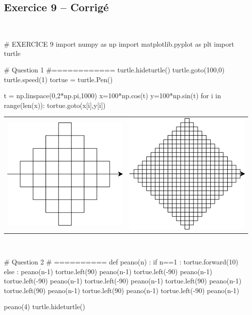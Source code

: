 \documentclass[10pt,fleqn]{article} %
\begin{document}
{}
\subsection*{Exercice 9 -- Corrigé}

\begin{corrige}
$\quad$
\begin{python}
# EXERCICE 9
import numpy as np
import matplotlib.pyplot as plt
import turtle

# Question 1 
#============
turtle.hideturtle()
turtle.goto(100,0)
turtle.speed(1)
tortue = turtle.Pen()

t = np.linspace(0,2*np.pi,1000)
x=100*np.cos(t)
y=100*np.sin(t)
for i in range(len(x)):
    tortue.goto(x[i],y[i])
\end{python}
\end{corrige}


\begin{center}
\begin{tabular}{cc}
\includegraphics[width=.3\linewidth]{images/exo_FB_09_01}&
\includegraphics[width=.3\linewidth]{images/exo_FB_09_02}
\end{tabular}
\end{center}



\begin{corrige}
$\quad$
\begin{python}
# Question 2 
# ==========
def peano(n) : 
    if n==1 :
        tortue.forward(10)
    else : 
        peano(n-1)
        tortue.left(90)
        peano(n-1)
        tortue.left(-90)
        peano(n-1)
        tortue.left(-90)
        peano(n-1)
        tortue.left(-90)
        peano(n-1)
        tortue.left(90)
        peano(n-1)
        tortue.left(90)
        peano(n-1)
        tortue.left(90)
        peano(n-1)
        tortue.left(-90)
        peano(n-1)
        
peano(4)
turtle.hideturtle()
\end{python}
\end{corrige}
\end{document}
